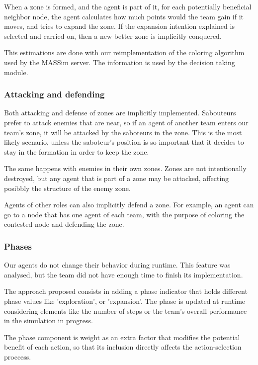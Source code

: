 \documentclass{llncs2e/llncs}
\begin{document}
    When a zone is formed, and the agent is part of it, for each potentially 
    beneficial neighbor node, the agent calculates how much points would the team 
    gain if it moves, and tries to expand the zone.
    If the expansion intention explained is selected and carried on, then a new 
    better zone is implicitly conquered.
    
    This estimations are done with our reimplementation of the coloring algorithm used 
    by the MASSim server. The information is used by the decision taking module.  

\subsubsection{Attacking and defending}
    
    Both attacking and defense of zones are implicitly implemented. 
    Sabouteurs prefer to attack enemies that are near, so if an agent of another 
    team enters our team's zone, it will be attacked by the saboteurs in the zone.
    This is the most likely scenario, unless the saboteur's position is so 
    important that it decides to stay in the formation in order to keep the zone.

    The same happens with enemies in their own zones. Zones are not intentionally 
    destroyed, but any agent that is part of a zone may be attacked, affecting 
    posibbly the structure of the enemy zone.
    
    Agents of other roles can also implicitly defend a zone. For example, an agent 
    can go to a node that has one agent of each team, with the purpose of coloring the 
    contested node and defending the zone.
    
\subsubsection{Phases}

    Our agents do not change their behavior during runtime. This feature was 
    analysed, but the team did not have enough time to finish its implementation.
    
    The approach proposed consists in adding a phase indicator that holds different 
    phase values like 'exploration', or 'expansion'. The phase is updated at runtime
    considering elements like the number of steps or the team's overall performance 
    in the simulation in progress.
    
    The phase component is weight as an extra factor that modifies the potential 
    benefit of each action, so that its inclusion directly affects the action-selection 
    proccess.
    
\end{document}
